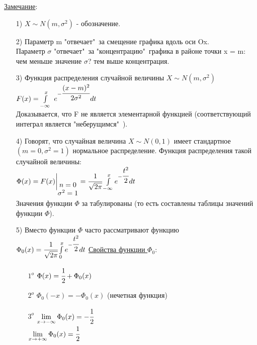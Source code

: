 \underline{Замечание}:
\begin{enumerate}
\item[1)] $X \sim N(m, \sigma^2)$ - обозначение. \\

\item[2)]%
Параметр m "отвечает"\ за смещение графика вдоль оси Ox. \\
Параметр $\sigma$ "отвечает"\ за "концентрацию"\ графика в районе точки x = m: чем меньше значение $\sigma$? тем выше концентрация.\\

\item[3)] Функция распределения случайной величины $X \sim N(m, \sigma^2)$ \\
$F(x) = \int\limits_{-\infty}^{x} \ e^{- \cfrac{(x-m)^2}{2 \sigma^2}} dt$ \\
Доказывается, что F не является элементарной функцией (соответствующий интеграл является "неберущимся"\ ). \\

\item[4)] Говорят, что случайная величина $X \sim N(0,1)$ имеет стандартное $(m = 0, \sigma^2 = 1)$ нормальное распределение. Функция распределения такой случайной величины: \\
$\Phi(x) = F(x) \bigg|_{\begin{matrix} n = 0 \\ \sigma^2 = 1 \\ \end{matrix}} = \cfrac{1}{\sqrt{2\pi}} \int\limits_{-\infty}^{x} e^{-\cfrac{t^2}{2}} dt$ \\
Значения функции $\Phi$ за табулированы (то есть составлены таблицы значений функции $\Phi$). \\

\item[5)] Вместо функции $\Phi$ часто рассматривают функцию \\
$\Phi_0 (x) = \cfrac{1}{\sqrt{2\pi}} \int\limits_{0}^{x} e^{- \cfrac{t^2}{2}} dt$
\underline{Свойства функции $\Phi_0$}:
	\begin{enumerate}
	\item[$1^o$] $\Phi(x) = \cfrac{1}{2} + \Phi_0(x)$ \\

	\item[$2^o$] $\Phi_0(-x) = -\Phi_0(x)$ (нечетная функция) \\

	\item[$3^o$] $\lim\limits_{x \to -\infty} \Phi_0(x) = -\cfrac{1}{2}$ \\
	$\lim\limits_{x \to +\infty} \Phi_0(x) = \cfrac{1}{2}$ \\


\end{enumerate}
\end{enumerate}
